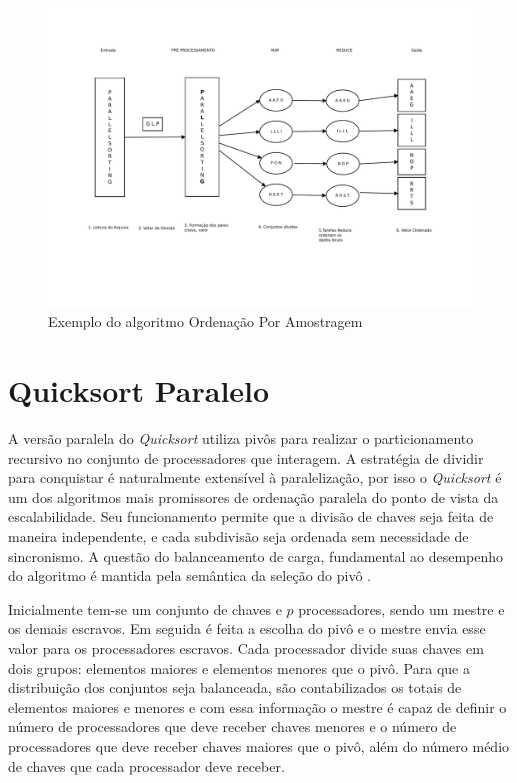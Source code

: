 \begin{figure}[htb]
\centering
\includegraphics[trim=2cm 4cm 2cm 2cm, width=\textwidth]{figuras/Samplesort2.pdf}
\caption{Exemplo do algoritmo Ordenação Por Amostragem}
\label{fig:samplesort}
\end{figure}



\section{Quicksort Paralelo}
\label{sec:quicksortParalelo}


 
 
A versão paralela do \textit{Quicksort} utiliza pivôs para realizar o particionamento recursivo no conjunto de processadores que interagem. 
 A estratégia de dividir para conquistar é naturalmente extensível à paralelização, por isso o \textit{Quicksort} é um dos algoritmos mais promissores de ordenação paralela do ponto de vista da escalabilidade. Seu funcionamento permite que a divisão de chaves seja feita de maneira independente, e cada subdivisão seja ordenada sem necessidade de sincronismo. A questão do balanceamento de carga, fundamental ao desempenho do algoritmo é mantida pela semântica da seleção do pivô \cite{Kale:2010}. 

Inicialmente tem-se um conjunto de chaves e $p$ processadores, sendo um mestre e os demais escravos. Em seguida é feita a escolha do pivô e o mestre envia esse valor para os processadores escravos. Cada processador divide suas chaves em dois grupos: elementos maiores e elementos menores que o pivô. 
Para que  a distribuição dos conjuntos seja balanceada, são contabilizados os totais de elementos maiores e menores e com essa informação o mestre é capaz de definir o número de processadores que deve receber chaves menores e o número de processadores que deve receber chaves maiores que o pivô, além do número médio de chaves que cada processador deve receber. 

